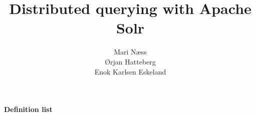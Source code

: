 \documentclass[pdftex,12pt,final,a4paper]{report}
\author{Mari Næss \\
Ørjan Hatteberg \\
Enok Karlsen Eskeland}
\begin{document}
\title{Distributed querying with Apache Solr}







%
%

\tableofcontents 

\listoffigures

\listoftables


\pagebreak
\thispagestyle{plain}
\begin{Huge}
\label{definitions}
\begin{flushleft}

\bf Definition list
\end{flushleft}
\end{Huge}
\end{document}
